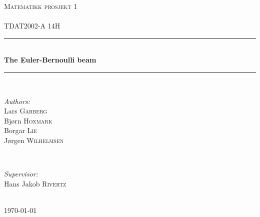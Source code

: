 

\begin{titlepage}

\newcommand{\HRule}{\rule{\linewidth}{0.5mm}} 

\center 

\textsc{\LARGE Matematikk prosjekt 1}\\[1.5cm] %
\textsc{\Large }\\[0.5cm] %
\textsc{\large TDAT2002-A 14H}\\[0.5cm] %

\HRule \\[0.4cm]
{ \huge \bfseries The Euler-Bernoulli beam}\\[0.4cm] 
\HRule \\[1.5cm]


\begin{minipage}{0.4\textwidth}
\begin{flushleft} \large
\emph{Authors:}\\
Lars \textsc{Garberg} \\
Bjørn \textsc{Hoxmark} \\
Borgar \textsc{Lie} \\
Jørgen \textsc{Wilhelmsen}

\end{flushleft}
\end{minipage}
~
\begin{minipage}{0.4\textwidth}
\begin{flushright} \large
\emph{Supervisor:} \\
 Hans Jakob \textsc{Rivertz} %
\end{flushright}
\end{minipage}\\[4cm]



{\large \today}\\[3cm] %


 

\vfill %

\end{titlepage}
